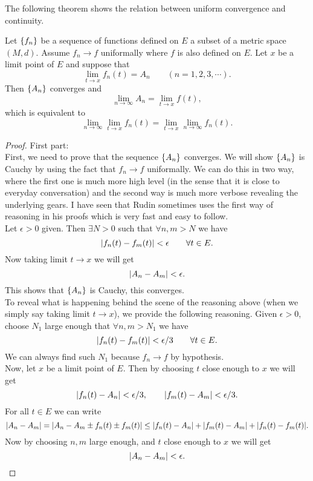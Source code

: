 The following theorem shows the relation between uniform convergence and continuity.

\begin{theorem}
	\label{thm:uniformContExchangeLimit}
	Let $\{f_n\}$ be a sequence of functions defined on $E$ a subset of a metric space $(M,d)$. Assume $f_n \to f$ uniformally where $f$ is also defined on $E$. Let $x$ be a limit point of $E$ and suppose that 
	\[ \lim_{t\to x}f_n(t) = A_n \qquad  (n=1,2,3,\cdots). \]
	Then $\{A_n\}$ converges and 
	\[ \lim_{n\to \infty} A_n = \lim_{t\to x} f(t), \]
	which is equivalent to 
	\[ \lim_{n\to \infty} \lim_{t\to x} f_n(t) = \lim_{t\to x} \lim_{n\to \infty} f_n(t). \]
\end{theorem}
\begin{proof}
	{\color{orange} First part: }\\
	First, we need to prove that the sequence $\{A_n\}$ converges. We will show $\{A_n\}$ is Cauchy by using the fact that $f_n \to f$ uniformally. We can do this in two way, where the first one is much more high level (in the sense that it is close to everyday conversation) and the second way is much more verbose revealing the underlying gears. I have seen that Rudin sometimes uses the first way of reasoning in his proofs which is very fast and easy to follow. \\
	Let $\epsilon>0$ given. Then $\exists N>0$ such that $\forall n,m>N$ we have
	\[ |f_n(t) - f_m(t)| < \epsilon \qquad \forall t\in E. \]
	Now taking limit $t\to x$ we will get
	\[ |A_n - A_m| < \epsilon. \]
	This shows that $\{A_n\}$ is Cauchy, this converges. \\
	To reveal what is happening behind the scene of the reasoning above (when we simply say taking limit $t\to x$), we provide the following reasoning. Given $\epsilon>0$, choose $N_1$ large enough that $\forall n,m>N_1$ we have 
	\[ |f_n(t) - f_m(t)| < \epsilon/3 \qquad \forall t\in E. \]
	We can always find such $N_1$ because $f_n \to f$ by hypothesis. \\
	Now, let $ x $ be a limit point of $ E $. Then by choosing $ t $ close enough to $  x $ we will get
	\[ |f_n(t) - A_n| < \epsilon/3,  \qquad |f_m(t) - A_m| < \epsilon/3. \]
	For all $ t \in E $ we can write
	\[ |A_n - A_m| = |A_n - A_m \pm f_n(t) \pm f_m(t)| \leq  |f_n(t) - A_n| + |f_m(t) - A_m| + |f_n(t) - f_m(t)|. \]
	Now by choosing $ n,m $ large enough, and $ t $ close enough to $ x $ we will get
	\[ |A_n - A_m| < \epsilon. \]

\end{proof}
